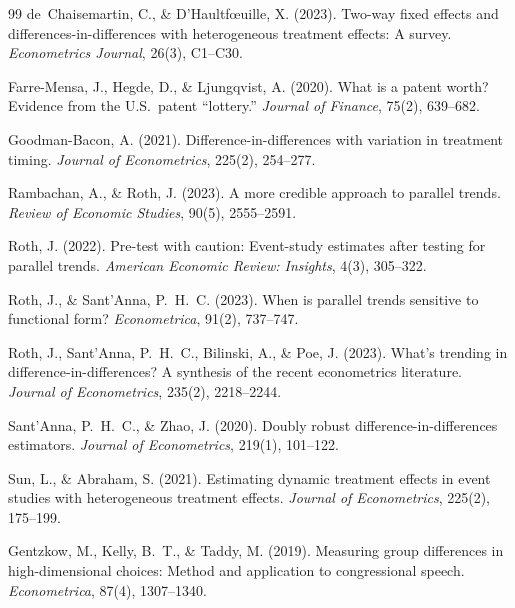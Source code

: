 \documentclass[12pt]{article}
\begin{document}
\begin{thebibliography}{99}
de~Chaisemartin, C., \& D'Haultf{\oe}uille, X. (2023). Two-way fixed effects and
differences-in-differences with heterogeneous treatment effects: A survey.
\textit{Econometrics Journal}, 26(3), C1--C30.

Farre-Mensa, J., Hegde, D., \& Ljungqvist, A. (2020). What is a patent worth? Evidence
from the U.S.\ patent ``lottery.'' \textit{Journal of Finance}, 75(2), 639--682.

Goodman-Bacon, A. (2021). Difference-in-differences with variation in treatment timing.
\textit{Journal of Econometrics}, 225(2), 254--277.

Rambachan, A., \& Roth, J. (2023). A more credible approach to parallel trends.
\textit{Review of Economic Studies}, 90(5), 2555--2591.

Roth, J. (2022). Pre-test with caution: Event-study estimates after testing for parallel
trends. \textit{American Economic Review: Insights}, 4(3), 305--322.

Roth, J., \& Sant'Anna, P.~H.~C. (2023). When is parallel trends sensitive to functional
form? \textit{Econometrica}, 91(2), 737--747.

Roth, J., Sant'Anna, P.~H.~C., Bilinski, A., \& Poe, J. (2023). What's trending in
difference-in-differences? A synthesis of the recent econometrics literature.
\textit{Journal of Econometrics}, 235(2), 2218--2244.

Sant'Anna, P.~H.~C., \& Zhao, J. (2020). Doubly robust difference-in-differences
estimators. \textit{Journal of Econometrics}, 219(1), 101--122.

Sun, L., \& Abraham, S. (2021). Estimating dynamic treatment effects in event studies
with heterogeneous treatment effects. \textit{Journal of Econometrics}, 225(2), 175--199.

Gentzkow, M., Kelly, B.~T., \& Taddy, M. (2019). Measuring group differences in
high-dimensional choices: Method and application to congressional speech.
\textit{Econometrica}, 87(4), 1307--1340.

\end{thebibliography}
\end{document}
